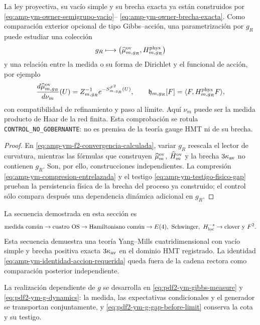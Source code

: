 \begin{proposition}
\label{prop:amp-ym-puente-accion-requerido}
La ley proyectiva, su vacío simple y su brecha exacta ya están construidos
por \eqref{eq:amp-ym-owner-semigrupo-vacio}--
\eqref{eq:amp-ym-owner-brecha-exacta}. Como comparación exterior opcional de
tipo Gibbs--acción, una parametrización por \(g_R\) puede estudiar una colección
\[
 g_R\longmapsto
 \bigl(\widehat\mu_{m,g_R}^{\rm ov},H_{m,g_R}^{\rm phys}\bigr)
\]
y una relación entre la medida o su forma de Dirichlet y el funcional de
acción, por ejemplo
\begin{equation}\label{eq:amp-ym-identidad-accion-requerida}
 \frac{d\widehat\mu_{m,g_R}^{\rm ov}}{d\nu_m}(U)
 =Z_{m,g_R}^{-1}e^{-S_{m,g_R}^{F^2}(U)},
 \qquad
 \mathfrak h_{m,g_R}[F]
 =\langle F,H_{m,g_R}^{\rm phys}F\rangle,
\end{equation}
con compatibilidad de refinamiento y paso al límite. Aquí \(\nu_m\) puede
ser la medida producto de Haar de la red finita. Esta comprobación se rotula
\texttt{CONTROL\_NO\_GOBERNANTE}: no es premisa de la teoría gauge HMT ni
de su brecha.
\end{proposition}

\begin{proof}
En \eqref{eq:amp-ym-f2-convergencia-calculada}, variar \(g_R\) reescala el
lector de curvatura, mientras las fórmulas que construyen
\(\widehat\mu_m^{\rm ov}\), \(\widehat H_m^{\rm ov}\) y la brecha
\(3\kappa_{\rm av}\) no contienen \(g_R\). Son, por ello, construcciones
independientes. La compresión
\eqref{eq:amp-ym-compresion-entrelazada} y el testigo
\eqref{eq:amp-ym-testigo-fisico-gap} prueban la persistencia física de la
brecha del proceso ya construido; el control sólo compara después una
dependencia dinámica adicional en \(g_R\).
\end{proof}

La secuencia demostrada en esta sección es
\[
 \text{medida común}\to\text{cuatro OS}\to\text{Hamiltoniano común}
 \to E(4),\ \text{Schwinger},\ H^{-s}_{\rm loc}
 \to\text{clover y }F^2.
\]
Esta secuencia demuestra una teoría Yang--Mills cuatridimensional con vacío
simple y brecha positiva exacta \(3\kappa_{\rm av}\) en el dominio HMT
registrado. La identidad
\eqref{eq:amp-ym-identidad-accion-requerida} queda fuera de la cadena
rectora como comparación posterior independiente.

La realización dependiente de \(g\) se desarrolla en
\eqref{eq:pdf2-ym-gibbs-measure} y
\eqref{eq:pdf2-ym-g-dynamics}: la medida, las expectativas
condicionales y el generador se transportan conjuntamente,
y \eqref{eq:pdf2-ym-g-gap-before-limit} conserva la cota y su testigo.
